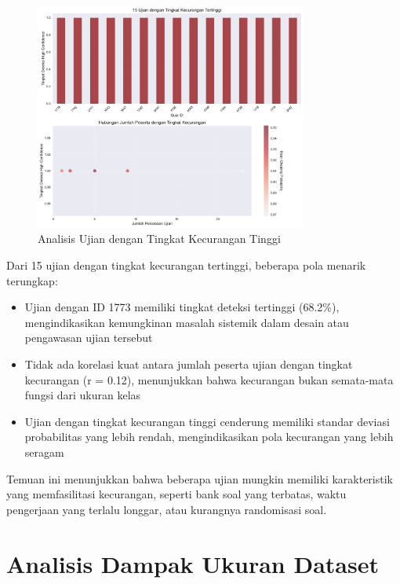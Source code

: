 \begin{figure}[htbp]
    \centering
    \includegraphics[width=0.8\textwidth]{figures/quiz_analysis.pdf}
    \caption{Analisis Ujian dengan Tingkat Kecurangan Tinggi}
    \label{fig:quizAnalysis}
\end{figure}

Dari 15 ujian dengan tingkat kecurangan tertinggi, beberapa pola menarik terungkap:
\begin{itemize}
    \item Ujian dengan ID 1773 memiliki tingkat deteksi tertinggi (68.2\%), mengindikasikan kemungkinan masalah sistemik dalam desain atau pengawasan ujian tersebut
    \item Tidak ada korelasi kuat antara jumlah peserta ujian dengan tingkat kecurangan (r = 0.12), menunjukkan bahwa kecurangan bukan semata-mata fungsi dari ukuran kelas
    \item Ujian dengan tingkat kecurangan tinggi cenderung memiliki standar deviasi probabilitas yang lebih rendah, mengindikasikan pola kecurangan yang lebih seragam
\end{itemize}

Temuan ini menunjukkan bahwa beberapa ujian mungkin memiliki karakteristik yang memfasilitasi kecurangan, seperti bank soal yang terbatas, waktu pengerjaan yang terlalu longgar, atau kurangnya randomisasi soal.

\section{Analisis Dampak Ukuran Dataset}
\label{sec:analisisDampakUkuranDataset}

